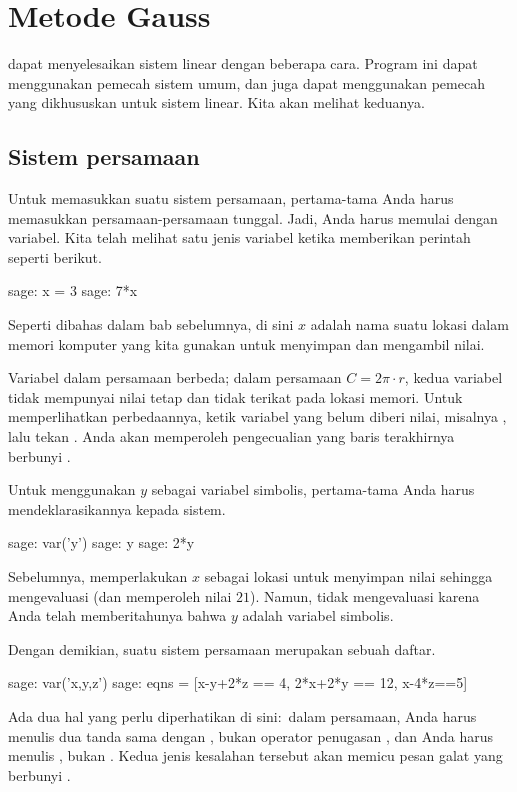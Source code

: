 \chapter{Metode Gauss}

\Sage{} dapat menyelesaikan sistem linear dengan beberapa cara.
Program ini dapat menggunakan pemecah sistem umum, dan
juga dapat menggunakan pemecah yang dikhususkan untuk sistem linear.
Kita akan melihat keduanya. 



\section{Sistem persamaan}
Untuk memasukkan suatu sistem persamaan, pertama-tama Anda harus memasukkan
persamaan-persamaan tunggal.
Jadi, Anda harus memulai dengan variabel.
Kita telah melihat satu jenis variabel ketika memberikan perintah seperti berikut.
\begin{sagecommandline}
sage: x = 3
sage: 7*x
\end{sagecommandline}
Seperti dibahas dalam bab sebelumnya,
di sini $x$ adalah nama suatu lokasi dalam memori komputer
yang kita gunakan untuk menyimpan dan mengambil nilai.

Variabel dalam persamaan berbeda; dalam persamaan
$C=2\pi\cdot r$, kedua variabel tidak mempunyai nilai tetap dan
tidak terikat pada lokasi memori. 
Untuk memperlihatkan perbedaannya, ketik variabel yang belum diberi nilai,
misalnya , lalu tekan .
Anda akan memperoleh pengecualian yang baris terakhirnya berbunyi
.

Untuk menggunakan $y$ sebagai variabel simbolis, pertama-tama Anda harus
mendeklarasikannya kepada sistem.
\begin{sagecommandline}
sage: var('y')
sage: y
sage: 2*y
\end{sagecommandline}
Sebelumnya, \Sage{} memperlakukan $x$ sebagai lokasi untuk menyimpan
nilai sehingga mengevaluasi  (dan memperoleh nilai $21$).
Namun, \Sage{} tidak mengevaluasi  karena
Anda telah memberitahunya bahwa $y$ adalah variabel simbolis.

Dengan demikian, suatu sistem persamaan merupakan sebuah daftar.
\begin{sagecommandline}
sage: var('x,y,z')                                  
sage: eqns = [x-y+2*z == 4, 2*x+2*y == 12, x-4*z==5]
\end{sagecommandline}
Ada dua hal yang perlu diperhatikan di sini:~dalam persamaan, Anda
harus menulis dua tanda sama dengan \inlinecode{==}, bukan
operator penugasan \inlinecode{=},
dan Anda harus menulis ,
bukan .
Kedua jenis kesalahan tersebut akan memicu pesan galat yang berbunyi
.

